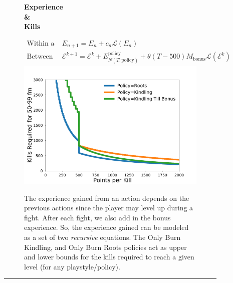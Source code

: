 \documentclass[]{article}
\newcommand{\lcol}{0.15}
\newcommand{\ccol}{0.55}
\newcommand{\rcol}{0.25}
\newcommand{\textsize}{\large}
\begin{document}
\begin{figure}[b]
		\begin{subfigure}{\lcol\linewidth}
		    \centering
		    \LARGE{\textbf{Experience\\\&\\Kills}}
		\end{subfigure}%
		\textsize
		\begin{subfigure}{\ccol\linewidth}
		    \begin{align*}
		    	\text{Within a Fight: }&\, E_{n+1} = E_{n} + c_n\mathcal{L}(E_{n})\\
		    	\text{Between Fights: }&\, \mathcal{E}^{k+1} = \mathcal{E}^k + E_{N(T; \text{policy})}^\text{policy} +
		    			 \theta(T - 500)M_\text{bonus}\mathcal{L}(\mathcal{E}^k)
		    \end{align*}
		    \centering
		    \includegraphics[width=0.9\linewidth]{policies.pdf}
		    \vspace{5mm}
		\end{subfigure}%
		\begin{subfigure}{\rcol\linewidth}
			\vspace{10mm}
		    The experience gained from an action depends on the previous actions since the player may level up during a fight. After each fight, we also add in the bonus experience. So, the experience gained can be modeled as a set of two \textit{recursive} equations. The Only Burn Kindling, and Only Burn Roots policies act as upper and lower bounds for the kills required to reach a given level (for any playstyle/policy). 
		\end{subfigure}
		\vspace{5mm}
		\hrule 


\end{figure}
\end{document}
